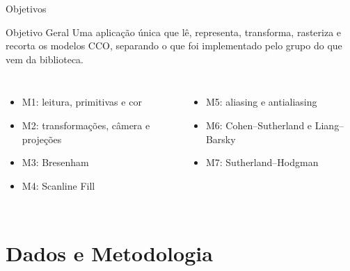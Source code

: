 \documentclass[aspectratio=169,11pt]{beamer}
\newcommand{\checkitem}{\textcolor{ufopred}{$\blacktriangleright$}}
\begin{document}
\begin{frame}{Objetivos}
\begin{block}{Objetivo Geral}
Uma aplicação única que lê, representa, transforma, rasteriza e recorta os modelos CCO, separando o que foi implementado pelo grupo do que vem da biblioteca.
\end{block}

\vspace{0.2cm}

\begin{columns}[T]
\begin{itemize}
  \item[\checkitem] M1: leitura, primitivas e cor
  \item[\checkitem] M2: transformações, câmera e projeções
  \item[\checkitem] M3: Bresenham
  \item[\checkitem] M4: Scanline Fill
\end{itemize}
\begin{itemize}
  \item[\checkitem] M5: aliasing e antialiasing
  \item[\checkitem] M6: Cohen--Sutherland e Liang--Barsky
  \item[\checkitem] M7: Sutherland--Hodgman
\end{itemize}
\end{columns}
\end{frame}

\section{Dados e Metodologia}
\end{document}
